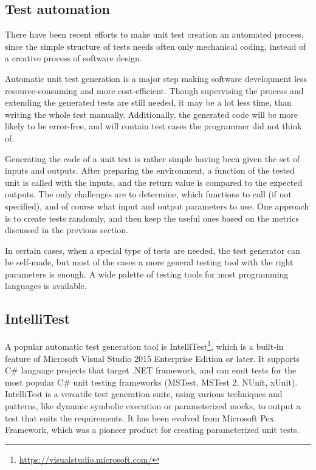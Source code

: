 \subsection{Test automation}

There have been recent efforts to make unit test creation an automated process, since the simple structure of tests needs often only mechanical coding, instead of a creative process of software design. 

Automatic unit test generation is a major step making software development less resource-consuming and more cost-efficient. Though supervising the process and extending the generated tests are still needed, it may be a lot less time, than writing the whole test manually. Additionally, the generated code will be more likely to be error-free, and will contain test cases the programmer did not think of.

Generating the code of a unit test is rather simple having been given the set of inputs and outputs. After preparing the environment, a function of the tested unit is called with the inputs, and the return value is compared to the expected outputs. The only challenges are to determine, which functions to call (if not specified), and of course what input and output parameters to use. One approach is to create tests randomly, and then keep the useful ones based on the metrics discussed in the previous section.

In certain cases, when a special type of tests are needed, the test generator can be self-made, but most of the cases a more general testing tool with the right parameters is enough. A wide palette of testing tools for most programming languages is available. 

\subsection{IntelliTest}
A popular automatic test generation tool is IntelliTest\footnote{\url{https://visualstudio.microsoft.com/}}, which is a built-in feature of Microsoft Visual Studio 2015 Enterprise Edition or later. It supports C\# language projects that target .NET framework, and can emit tests for the most popular C\# unit testing frameworks (MSTest, MSTest 2, NUnit, xUnit). IntelliTest is a versatile test generation suite, using various techniques and patterns, like dynamic symbolic execution or parameterized mocks, to output a test that suits the requirements. It has been evolved from Microsoft Pex Framework, which was a pioneer product for creating parameterized unit tests.  \cite{advances-in-unit-testing-theory-and-practice, intellitest_manual}
